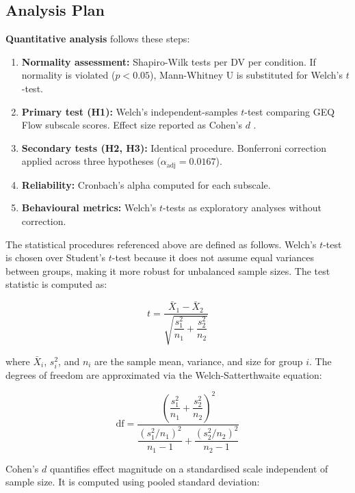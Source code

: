 \subsection{Analysis Plan}

\textbf{Quantitative analysis} follows these steps:

\begin{enumerate}
\item \textbf{Normality assessment:} Shapiro-Wilk tests per DV per condition. If normality is violated ($p < 0.05$), Mann-Whitney U is substituted for Welch's $t$-test.
\item \textbf{Primary test (H1):} Welch's independent-samples $t$-test comparing GEQ Flow subscale scores. Effect size reported as Cohen's $d$ \citep{cohen1988statistical}.
\item \textbf{Secondary tests (H2, H3):} Identical procedure. Bonferroni correction applied across three hypotheses ($\alpha_{\text{adj}} = 0.0167$).
\item \textbf{Reliability:} Cronbach's alpha computed for each subscale.
\item \textbf{Behavioural metrics:} Welch's $t$-tests as exploratory analyses without correction.
\end{enumerate}

The statistical procedures referenced above are defined as follows. Welch's $t$-test is chosen over Student's $t$-test because it does not assume equal variances between groups, making it more robust for unbalanced sample sizes. The test statistic is computed as:

\begin{equation}
t = \frac{\bar{X}_1 - \bar{X}_2}{\sqrt{\dfrac{s_1^2}{n_1} + \dfrac{s_2^2}{n_2}}}
\label{eq:welch}
\end{equation}

\noindent where $\bar{X}_i$, $s_i^2$, and $n_i$ are the sample mean, variance, and size for group $i$. The degrees of freedom are approximated via the Welch-Satterthwaite equation:

\begin{equation}
\text{df} = \frac{\left(\dfrac{s_1^2}{n_1} + \dfrac{s_2^2}{n_2}\right)^{2}}{\dfrac{\left(s_1^2 / n_1\right)^{2}}{n_1 - 1} + \dfrac{\left(s_2^2 / n_2\right)^{2}}{n_2 - 1}}
\label{eq:welch_df}
\end{equation}

Cohen's $d$ \citep{cohen1988statistical} quantifies effect magnitude on a standardised scale independent of sample size. It is computed using pooled standard deviation:

